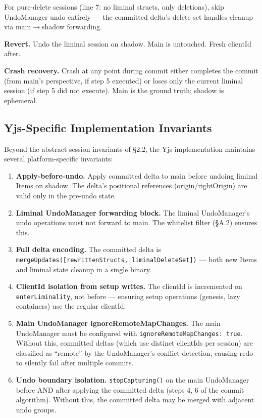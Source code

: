 For pure-delete sessions (line 7: no liminal structs, only deletions), skip UndoManager undo entirely --- the committed delta's delete set handles cleanup via main$\rightarrow$shadow forwarding.

\textbf{Revert.} Undo the liminal session on shadow. Main is untouched. Fresh clientId after.

\textbf{Crash recovery.} Crash at any point during commit either completes the commit (from main's perspective, if step 5 executed) or loses only the current liminal session (if step 5 did not execute). Main is the ground truth; shadow is ephemeral.

\subsection{Yjs-Specific Implementation Invariants}

Beyond the abstract session invariants of \S2.2, the Yjs implementation maintains several platform-specific invariants:

\begin{enumerate}
    \item \textbf{Apply-before-undo.} Apply committed delta to main before undoing liminal Items on shadow. The delta's positional references (origin/rightOrigin) are valid only in the pre-undo state.
    \item \textbf{Liminal UndoManager forwarding block.} The liminal UndoManager's undo operations must not forward to main. The whitelist filter (\S A.2) ensures this.
    \item \textbf{Full delta encoding.} The committed delta is \texttt{mergeUpdates([rewrittenStructs, liminalDeleteSet])} --- both new Items and liminal state cleanup in a single binary.
    \item \textbf{ClientId isolation from setup writes.} The clientId is incremented on \texttt{enterLiminality}, not before --- ensuring setup operations (genesis, lazy containers) use the regular clientId.
    \item \textbf{Main UndoManager ignoreRemoteMapChanges.} The main UndoManager must be configured with \texttt{ignoreRemoteMapChanges: true}. Without this, committed deltas (which use distinct clientIds per session) are classified as ``remote'' by the UndoManager's conflict detection, causing redo to silently fail after multiple commits.
    \item \textbf{Undo boundary isolation.} \texttt{stopCapturing()} on the main UndoManager before AND after applying the committed delta (steps 4, 6 of the commit algorithm). Without this, the committed delta may be merged with adjacent undo groups.
\end{enumerate}

